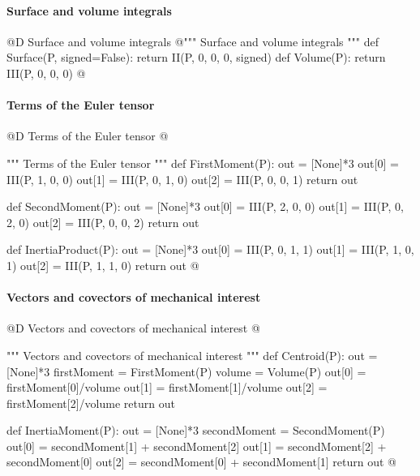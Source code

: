 \documentclass[11pt,oneside]{article}	%
\begin{document}
\paragraph{Surface and volume integrals}
@D Surface and volume integrals
@{""" Surface and volume integrals """
def Surface(P, signed=False):
    return II(P, 0, 0, 0, signed)
def Volume(P):
    return III(P, 0, 0, 0)
@}


\paragraph{Terms of the Euler tensor}
@D Terms of the Euler tensor
@{""" Terms of the Euler tensor """
def FirstMoment(P):
    out = [None]*3
    out[0] = III(P, 1, 0, 0)
    out[1] = III(P, 0, 1, 0)
    out[2] = III(P, 0, 0, 1)
    return out

def SecondMoment(P):
    out = [None]*3
    out[0] = III(P, 2, 0, 0)
    out[1] = III(P, 0, 2, 0)
    out[2] = III(P, 0, 0, 2)
    return out

def InertiaProduct(P):
    out = [None]*3
    out[0] = III(P, 0, 1, 1)
    out[1] = III(P, 1, 0, 1)
    out[2] = III(P, 1, 1, 0)
    return out
@}




\paragraph{Vectors and covectors of mechanical interest}
@D Vectors and covectors of mechanical interest
@{""" Vectors and covectors of mechanical interest """
def Centroid(P):
    out = [None]*3
    firstMoment = FirstMoment(P)
    volume = Volume(P)
    out[0] = firstMoment[0]/volume
    out[1] = firstMoment[1]/volume
    out[2] = firstMoment[2]/volume
    return out

def InertiaMoment(P):
    out = [None]*3
    secondMoment = SecondMoment(P)
    out[0] = secondMoment[1] + secondMoment[2]
    out[1] = secondMoment[2] + secondMoment[0]
    out[2] = secondMoment[0] + secondMoment[1]
    return out
@}
\end{document}
